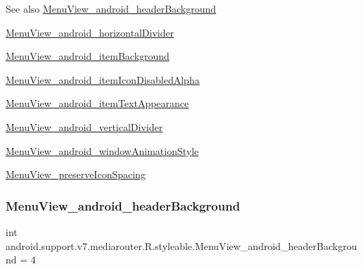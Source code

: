 \begin{DoxySeeAlso}{See also}
\hyperlink{classandroid_1_1support_1_1v7_1_1mediarouter_1_1R_1_1styleable_a2de4fb6def01d6c4b2d7cc86e961a58d}{Menu\+View\+\_\+android\+\_\+header\+Background} 

\hyperlink{classandroid_1_1support_1_1v7_1_1mediarouter_1_1R_1_1styleable_a0dfdc070e508eda10bc6aec3af09d0b9}{Menu\+View\+\_\+android\+\_\+horizontal\+Divider} 

\hyperlink{classandroid_1_1support_1_1v7_1_1mediarouter_1_1R_1_1styleable_a12e27d06c79c07df1c4f4294540a5dd6}{Menu\+View\+\_\+android\+\_\+item\+Background} 

\hyperlink{classandroid_1_1support_1_1v7_1_1mediarouter_1_1R_1_1styleable_a2db0c55a5ea64d6e4e520e5461ab2486}{Menu\+View\+\_\+android\+\_\+item\+Icon\+Disabled\+Alpha} 

\hyperlink{classandroid_1_1support_1_1v7_1_1mediarouter_1_1R_1_1styleable_a20e8a09f6069c46231defb4f911cb006}{Menu\+View\+\_\+android\+\_\+item\+Text\+Appearance} 

\hyperlink{classandroid_1_1support_1_1v7_1_1mediarouter_1_1R_1_1styleable_a547babce2fcf74d1db985fc93e6781e5}{Menu\+View\+\_\+android\+\_\+vertical\+Divider} 

\hyperlink{classandroid_1_1support_1_1v7_1_1mediarouter_1_1R_1_1styleable_ac9fd0f82d65057d958023557551b7306}{Menu\+View\+\_\+android\+\_\+window\+Animation\+Style} 

\hyperlink{classandroid_1_1support_1_1v7_1_1mediarouter_1_1R_1_1styleable_ae65c88e6a427903c40bab472037f77a2}{Menu\+View\+\_\+preserve\+Icon\+Spacing} 
\end{DoxySeeAlso}
\mbox{\label{classandroid_1_1support_1_1v7_1_1mediarouter_1_1R_1_1styleable_a2de4fb6def01d6c4b2d7cc86e961a58d}} 
\subsubsection{\texorpdfstring{Menu\+View\+\_\+android\+\_\+header\+Background}{MenuView\_android\_headerBackground}}
{\footnotesize\ttfamily int android.\+support.\+v7.\+mediarouter.\+R.\+styleable.\+Menu\+View\+\_\+android\+\_\+header\+Background = 4\hspace{0.3cm}{\ttfamily [static]}}

